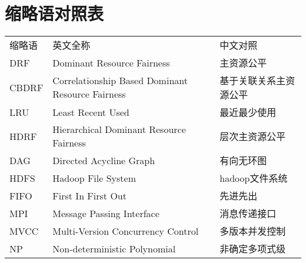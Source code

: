 \chapter*{缩略语对照表}
  \begin{tabular}{p{}p{}p{}}
  	缩略语 & 英文全称 & 中文对照 \\
	DRF & Dominant Resource Fairness & 主资源公平 \\
	CBDRF & Correlationship Based Dominant Resource Fairness & 基于关联关系主资源公平 \\
	LRU& Least Recent Used & 最近最少使用\\
	HDRF & Hierarchical Dominant Resource Fairness & 层次主资源公平\\
	DAG & Directed Acycline Graph & 有向无环图\\
	HDFS & Hadoop File System & hadoop文件系统\\
	FIFO & First In First Out & 先进先出\\
	MPI &Message Passing Interface&消息传递接口\\
	MVCC & Multi-Version Concurrency Control&多版本并发控制\\
	NP & Non-deterministic Polynomial & 非确定多项式级\\
  \end{tabular}
